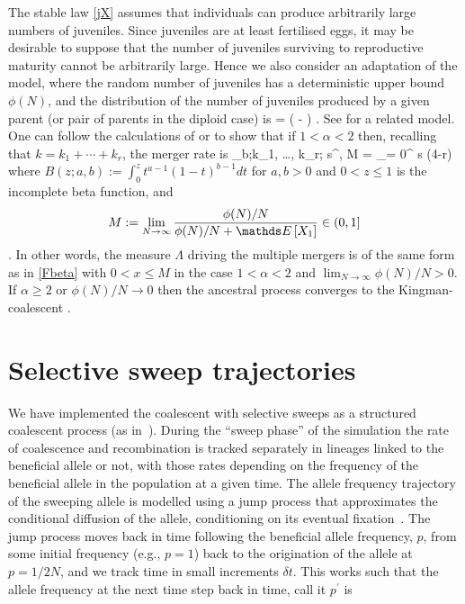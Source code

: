 \documentclass{article}
\begin{document}
The stable law \eqref{jX} assumes that individuals can produce arbitrarily
large numbers of juveniles. Since juveniles are at least fertilised eggs,
it may be desirable to suppose that the number of juveniles
surviving to reproductive maturity cannot be arbitrarily large.  Hence we also consider
an adaptation of the \cite{schweinsberg03} model, where
the random number of juveniles has a deterministic upper bound $\phi(N)$,
and the distribution of the number of juveniles produced by a given parent
(or pair of parents in the diploid case) is
\be\label{jtr}  =   
  \left(  -
  \right) . \ee
See \citet{Eldon2018} for a related model.   One can follow the calculations of
\cite{schweinsberg03} or \cite{BLS15}  to show  that  if $1 < \alpha < 2$
then, recalling that $k = k_1 + \cdots + k_r$, the merger rate is
 \be \lambda_{b;k_1, \ldots, k_r; s}^{, M} =  \sum_{\ell = 0}^{ s \wedge (4-r) }
  
\ee
where $B(z;a,b) := \int_0^z
t^{a-1}(1-t)^{b-1}dt$ for  $a,b>0$ and $0< z\le 1$ is the incomplete beta function, and
\begin{equation*}
M :=  \lim_{ N \to \infty } \frac{\phi(N) / N}{\phi(N) / N + \EE{X_1}} \in (0, 1]
\end{equation*}
\citep{CDEE2020}.    In other words,  the measure $\Lambda$ driving
the multiple mergers is of the same form as in \eqref{Fbeta}  with $0 < x
\le M$ in the case $1 < \alpha < 2$ and $\lim_{ N \to \infty } \phi(N) / N > 0$.   If $\alpha \ge 2$
or $\phi(N)/N \to 0$ then  the  ancestral process converges to  the Kingman-coalescent
\citep{CDEE2020}.

\label{app-sweeps}
\section*{Selective sweep trajectories}
We have implemented the coalescent with selective sweeps as a structured
coalescent process (as in~\citep{braverman1995hitchhiking}). During the
``sweep phase'' of the simulation the rate of coalescence and recombination
is tracked separately in lineages linked to the beneficial allele or not,
with those rates depending on the frequency of the beneficial allele in
the population at a given time. The allele frequency trajectory of the
sweeping allele is modelled using a jump process that approximates
the conditional diffusion of the allele, conditioning on its eventual
fixation~\citep{coop2004ancestral}.
The jump process moves back in time following the beneficial
allele frequency, $p$, from some initial frequency (e.g., $p=1$) back to
the origination of the allele at $p=1/2N$, and we track time in small
increments $\delta t$. This works such that the allele frequency at
the next time step back in time, call it $p^\prime$ is
\end{document}
